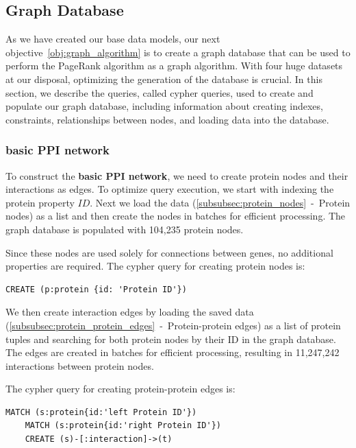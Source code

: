 \subsection{Graph Database} \label{subsec:graph_database}

As we have created our base data models, our next objective~\ref{obj:graph_algorithm} is to create a graph database
that can be used to perform the PageRank algorithm as a graph algorithm.
With four huge datasets at our disposal, optimizing the generation of the database is crucial.
In this section, we describe the queries, called cypher queries, used to create and populate our graph database,
including information about creating indexes, constraints, relationships between nodes, and loading data into the database.\\


\subsubsection*{basic PPI network} \label{subsubsec:basic_ppi_network}
To construct the \textbf{basic PPI network}, we need to create protein nodes and their interactions as edges.
To optimize query execution, we start with indexing the protein property $ID$.
Next we load the data (\cref{subsubsec:protein_nodes}~-~Protein nodes) as a list and then create the nodes in batches for efficient processing.
The graph database is populated with 104,235 protein nodes.

Since these nodes are used solely for connections between genes, no additional properties are required.
The cypher query for creating protein nodes is:
\begin{lstlisting}[language=Cypher, label={lst:protein_nodes}]
    CREATE (p:protein {id: 'Protein ID'})
\end{lstlisting}
\vspace{\baselineskip}

We then create interaction edges by loading the saved data (\cref{subsubsec:protein_protein_edges}~-~Protein-protein edges)
as a list of protein tuples and searching for both protein nodes by their ID in the graph database.
The edges are created in batches for efficient processing, resulting in 11,247,242 interactions between protein nodes.

The cypher query for creating protein-protein edges is:
\begin{lstlisting}[language=Cypher, label={lst:protein_edges}]
    MATCH (s:protein{id:'left Protein ID'})
    MATCH (s:protein{id:'right Protein ID'})
    CREATE (s)-[:interaction]->(t)
\end{lstlisting}

